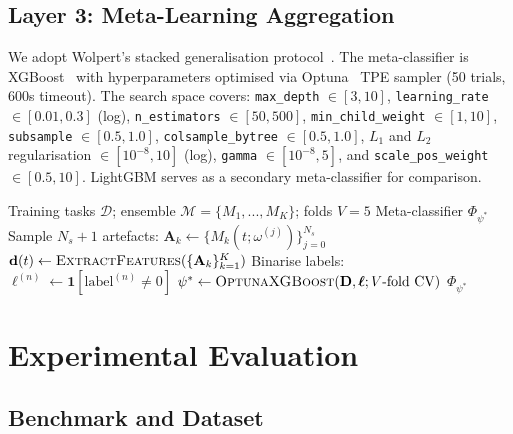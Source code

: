\documentclass[11pt,a4paper]{article}
\begin{document}
\subsection{Layer 3: Meta-Learning Aggregation}

We adopt Wolpert's stacked generalisation protocol~\cite{wolpert1992stacking}. The meta-classifier is XGBoost~\cite{chen2016xgboost} with hyperparameters optimised via Optuna~\cite{akiba2019optuna} TPE sampler (50 trials, 600s timeout). The search space covers: \texttt{max\_depth} $\in [3,10]$, \texttt{learning\_rate} $\in [0.01, 0.3]$ (log), \texttt{n\_estimators} $\in [50, 500]$, \texttt{min\_child\_weight} $\in [1, 10]$, \texttt{subsample} $\in [0.5, 1.0]$, \texttt{colsample\_bytree} $\in [0.5, 1.0]$, $L_1$ and $L_2$ regularisation $\in [10^{-8}, 10]$ (log), \texttt{gamma} $\in [10^{-8}, 5]$, and \texttt{scale\_pos\_weight} $\in [0.5, 10]$. LightGBM serves as a secondary meta-classifier for comparison.

\begin{algorithm}[t]
\caption{EMHD: Training Pipeline}
\label{alg:training}
\begin{algorithmic}[1]
\REQUIRE Training tasks $\mathcal{D}$; ensemble $\mathcal{M} = \{M_1,...,M_K\}$; folds $V=5$
\ENSURE Meta-classifier $\Phi_{\psi^*}$
    \STATE Sample $N_s + 1$ artefacts: $\mathbf{A}_k \leftarrow \{M_k(t;\omega^{(j)})\}_{j=0}^{N_s}$
  \ENDFOR
  \STATE $\mathbf{d}(t) \leftarrow \textsc{ExtractFeatures}(\{\mathbf{A}_k\}_{k=1}^K)$
  \hfill{}
\ENDFOR
\STATE Binarise labels: $\ell^{(n)} \leftarrow \mathbf{1}[\text{label}^{(n)} \neq 0]$
\STATE $\psi^* \leftarrow \textsc{OptunaXGBoost}(\mathbf{D}, \boldsymbol{\ell}; V\text{-fold CV})$
\hfill{}
\RETURN $\Phi_{\psi^*}$
\end{algorithmic}
\end{algorithm}


\section{Experimental Evaluation}
\label{sec:eval}

\subsection{Benchmark and Dataset}
\label{sec:dataset}
\end{document}
